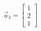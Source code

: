 \documentclass[preview]{standalone}
\begin{document}
\begin{align*}
\vec{a}_3=\begin{bmatrix} 1 \\ 2 \\ 1 \end{bmatrix}
\end{align*}
\end{document}
